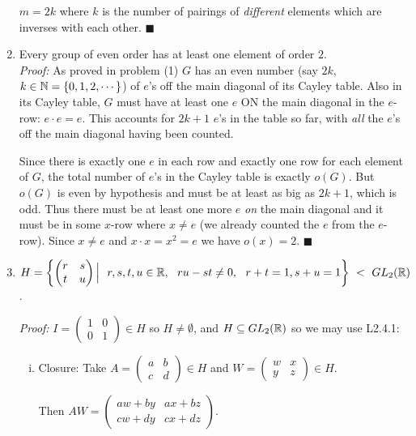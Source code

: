 \begin{enumerate}
    $m=2k$ where $k$ is the number of pairings of \textit{different} elements which are inverses with each other. $\blacksquare$
    \item Every group of even order has at least one element of order $2$.\\
\textit{Proof:} As proved in problem (1) $G$ has an even number (say $2k$, $k\in {\mathbb{ N}} = \{0,1,2, \cdots \}$) of $e$'s off the 
main diagonal of its Cayley table. Also in its Cayley table, $G$ must have at least one $e$ ON the main diagonal in the $e$-row: $e\cdot e = e$. This accounts for $2k+1$ $e$'s in the table so far, with \textit{all} the $e$'s off the main diagonal having been counted. \steezybreak

Since there is exactly one $e$ in each row and exactly one row for each element of $G$, the total number of $e$'s in the Cayley table is exactly $o(G)$. But $o(G)$ is even by hypothesis and must be at least as big as $2k+1$, which is odd. Thus there must be at least one more $e$ \textit{on} the main diagonal and it must be in some $x$-row where $x\neq e$ (we already counted the $e$ from the $e$-row).
Since $x\neq e$ and $x\cdot x = x^2 =e$ we have $o(x)=2$. $\blacksquare$
\newpage 
\item $H = \left\{ \begin{pmatrix}
r & s \\ t & u
\end{pmatrix} \Big| \ \ r,s,t,u \in {\mathbb{ R}}, \ \ ru-st \neq 0, \ \ r+t=1, s+u =1 \right\} \ < \ GL_2({\mathbb{ R}})$.

\textit{Proof:} $I = \begin{pmatrix}
    1 & 0 \\ 0 & 1
\end{pmatrix} \in H$ so $H\neq \emptyset$, and $H\subseteq GL_2({\mathbb{ R}})$ so we may use L2.4.1:
\begin{enumerate}[i)]
    \item Closure: Take $A=\begin{pmatrix}
        a & b \\ c&d
    \end{pmatrix} \in H$ and $W=\begin{pmatrix}
        w & x \\ y&z
    \end{pmatrix} \in H.$

    Then $AW = \begin{pmatrix}
        aw+by & ax+bz \\ 
        cw+dy & cx+dz
    \end{pmatrix}$.


\end{enumerate}
\end{enumerate}

